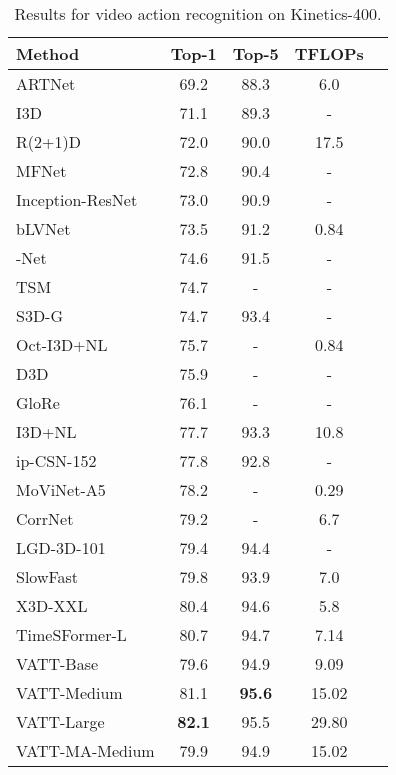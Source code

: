 \documentclass[10pt,twocolumn,letterpaper]{article}
\newcommand{\ours}{VATT\xspace}
\begin{document}
\begin{table}[h]
    \small
    \centering
    \begin{tabular}{@{}lcccc@{}}
    \toprule
        \sc Method & \sc Top-1 & \sc Top-5 & \sc TFLOPs\\
    \midrule
    ARTNet~\cite{wang2018nonlocal} & 69.2 & 88.3 & 6.0\\
    I3D~\cite{carreira2017quo} & 71.1 & 89.3 & -\\
    R(2+1)D~\cite{du2017r2+1d}  & 72.0 & 90.0 & 17.5\\
    MFNet~\cite{lee2018motion} & 72.8 & 90.4 & -\\
    Inception-ResNet~\cite{alom2020improved} & 73.0 & 90.9 & -\\
    bLVNet~\cite{fan2019blvnet} & 73.5 & 91.2 & 0.84\\
    -Net~\cite{chen20182} & 74.6 & 91.5 & -\\
    TSM~\cite{lin2019tsm} & 74.7 & - & -\\
    S3D-G~\cite{xie2018rethinking} & 74.7 & 93.4 & -\\
    Oct-I3D+NL~\cite{chen2019drop} & 75.7 & - & 0.84\\
    D3D~\cite{stroud2020d3d} & 75.9 & - & -\\
    GloRe~\cite{glore} & 76.1 & - & -\\
    I3D+NL~\cite{wang2018nonlocal} & 77.7 & 93.3 & 10.8\\
    ip-CSN-152~\cite{tran2019video} & 77.8 & 92.8 & -\\
    MoViNet-A5~\cite{kondratyuk2021movinets} & 78.2 & - & 0.29 \\
    CorrNet~\cite{corrnet} & 79.2 & - & 6.7\\
    LGD-3D-101~\cite{lgdnet} & 79.4 & 94.4 & -\\
    SlowFast~\cite{slowfast} & 79.8 & 93.9 & 7.0\\
    X3D-XXL~\cite{feichtenhofer2020x3d} & 80.4 & 94.6 & 5.8\\
    TimeSFormer-L~\cite{bertasius2021space} & 80.7 & 94.7 & 7.14\\
\midrule
    \ours-Base & 79.6 & 94.9 & 9.09\\
    \ours-Medium & 81.1 & \textbf{95.6} & 15.02\\
    \ours-Large & \textbf{82.1} & 95.5 & 29.80\\
    \midrule
    \ours-MA-Medium & 79.9 & 94.9 & 15.02\\
    \bottomrule
    \end{tabular}
    \vspace{2mm}
    \caption{Results for video action recognition on Kinetics-400.}
    \label{table:video-classification-k400}
    \vspace{-2mm}
\end{table}
\end{document}
